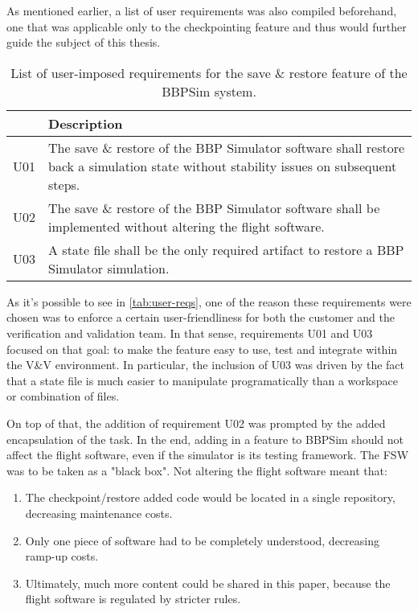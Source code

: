 {As mentioned earlier, a list of user requirements was also compiled beforehand, one that was applicable only to the checkpointing feature and thus would further guide the subject of this thesis. 

\begin{table}[htbp]
	\vspace{12pt}
	\centering
	\begin{tabularx}{\linewidth}{>{\centering}p{3cm} X}
		\toprule
		{\bfseries Requirement\newline Number} & \textbf{Description}\\
		\midrule
		U01 & {The save \& restore of the BBP Simulator software shall restore back a simulation state without stability issues on subsequent steps.}\\
		\midrule
		U02 & {The save \& restore of the BBP Simulator software shall be implemented without altering the flight software.}\\
		\midrule
		U03 & {A state file shall be the only required artifact to restore a BBP Simulator simulation.}\\
		\bottomrule
	\end{tabularx}
	\caption{List of user-imposed requirements for the save \& restore feature of the \gls{BBPSim} system.}
	\label{tab:user-reqs}
\end{table}

As it's possible to see in \autoref{tab:user-reqs}, one of the reason these requirements were chosen was to enforce a certain user-friendliness for both the customer and the verification and validation team. In that sense, requirements U01 and U03 focused on that goal: to make the feature easy to use, test and integrate within the V\&V environment. In particular, the inclusion of U03 was driven by the fact that a state file is much easier to manipulate programatically than a workspace or combination of files.

On top of that, the addition of requirement U02 was prompted by the added encapsulation of the task. In the end, adding in a feature to \gls{BBPSim} should not affect the flight software, even if the simulator is its testing framework. The FSW was to be taken as a "black box". Not altering the flight software meant that:
\begin{enumerate}
	\item The checkpoint/restore added code would be located in a single repository, decreasing maintenance costs.
	\item Only one piece of software had to be completely understood, decreasing ramp-up costs.
	\item Ultimately, much more content could be shared in this paper, because the flight software is regulated by stricter rules.
\end{enumerate}

}
